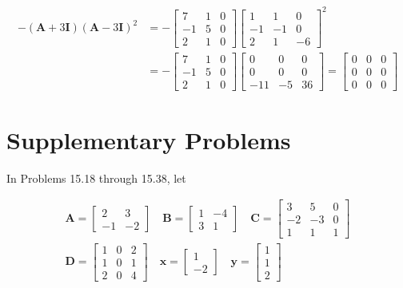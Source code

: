 \documentclass[10pt]{article}
\begin{document}
$$
\begin{aligned}
-(\mathbf{A}+3 \mathbf{I})(\mathbf{A}-3 \mathbf{I})^{2} & =-\left[\begin{array}{rrr}
7 & 1 & 0 \\
-1 & 5 & 0 \\
2 & 1 & 0
\end{array}\right]\left[\begin{array}{rrr}
1 & 1 & 0 \\
-1 & -1 & 0 \\
2 & 1 & -6
\end{array}\right]^{2} \\
& =-\left[\begin{array}{rrr}
7 & 1 & 0 \\
-1 & 5 & 0 \\
2 & 1 & 0
\end{array}\right]\left[\begin{array}{rrr}
0 & 0 & 0 \\
0 & 0 & 0 \\
-11 & -5 & 36
\end{array}\right]=\left[\begin{array}{lll}
0 & 0 & 0 \\
0 & 0 & 0 \\
0 & 0 & 0
\end{array}\right]
\end{aligned}
$$

\section*{Supplementary Problems}
In Problems 15.18 through 15.38, let

$$
\begin{gathered}
\mathbf{A}=\left[\begin{array}{rr}
2 & 3 \\
-1 & -2
\end{array}\right] \quad \mathbf{B}=\left[\begin{array}{rr}
1 & -4 \\
3 & 1
\end{array}\right] \quad \mathbf{C}=\left[\begin{array}{rrr}
3 & 5 & 0 \\
-2 & -3 & 0 \\
1 & 1 & 1
\end{array}\right] \\
\mathbf{D}=\left[\begin{array}{lll}
1 & 0 & 2 \\
1 & 0 & 1 \\
2 & 0 & 4
\end{array}\right] \quad \mathbf{x}=\left[\begin{array}{r}
1 \\
-2
\end{array}\right] \quad \mathbf{y}=\left[\begin{array}{l}
1 \\
1 \\
2
\end{array}\right]
\end{gathered}
$$
\end{document}
